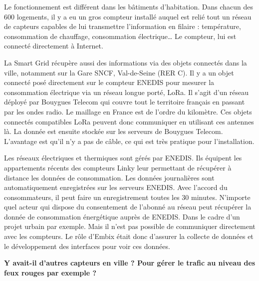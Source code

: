 Le fonctionnement est différent dans les bâtiments d'habitation.
Dans chacun des 600 logements, il y a eu un gros compteur installé
auquel est relié tout un réseau de capteurs capables de lui transmettre l’information en filaire :
température, consommation de chauffage, consommation électrique\dots
Le compteur, lui est connecté directement à Internet.

La Smart Grid récupère aussi des informations via des objets connectés dans la ville,
notamment sur la Gare SNCF, Val-de-Seine (RER C).
Il y a un objet connecté posé directement sur le compteur ENEDIS pour mesurer la consommation électrique via un réseau longue porté, LoRa.
Il s’agit d’un réseau déployé par Bouygues Telecom qui couvre tout le territoire français en passant par les ondes radio.
Le maillage en France est de l’ordre du kilomètre.
Ces objets connectés compatibles LoRa peuvent donc communiquer en utilisant ces antennes là.
La donnée est ensuite stockée sur les serveurs de Bouygues Telecom.
L’avantage est qu’il n’y a pas de câble, ce qui est très pratique pour l’installation.

Les réseaux électriques et thermiques sont gérés par ENEDIS.
Ils équipent les appartements récents des compteurs Linky leur permettant de récupérer à distance les données de consommation.
Les données journalières sont automatiquement enregistrées sur les serveurs ENEDIS.
Avec l’accord du consommateurs, il peut faire un enregistrement toutes les 30 minutes.
N’importe quel acteur qui dispose du consentement de l’abonné au réseau peut récupérer la donnée de consommation énergétique auprès de ENEDIS.
Dans le cadre d’un projet urbain par exemple.
Mais il n'est pas possible de communiquer directement avec les compteurs.
Le rôle d'Embix était donc d'assurer la collecte de données et le développement des interfaces pour voir ces données.

\textbf{Y avait-il d'autres capteurs en ville ? Pour gérer le trafic au niveau des feux rouges par exemple ?}

